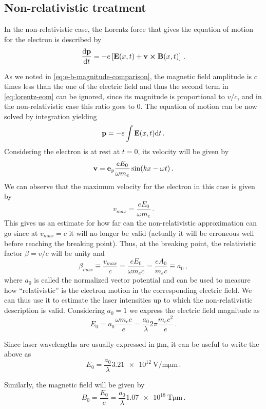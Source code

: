 \documentclass[12pt, class=report, crop=false]{standalone}
\begin{document}
\subsection{Non-relativistic treatment}

In the non-relativistic case, the Lorentz force that gives the equation of motion for the electron is described by
\begin{equation}
  \label{eq:lorentz-eom}
  \dv{\vb{p}}{t} = -e \left[ \vb{E}(x, t) + \vb{v} \cp \vb{B}(x, t) \right]\,.
\end{equation}

As we noted in \cref{eq:e-b-magnitude-comparison}, the magnetic field amplitude is \(c\) times less than the one
of the electric field and thus the second term in \cref{eq:lorentz-eom} can be ignored, since its magnitude
is proportional to \(v/c\), and in the non-relativistic case
this ratio goes to 0. The equation of motion can be now solved by integration yielding
\[
\vb{p} = -e \int \vb{E}(x,t) \dd t\,.
\]
Considering the electron is at rest at \(t=0\), its velocity
will be given by
\[
\vb{v} = \vb{e}_y \frac{e E_0}{\omega m_e} \sin(kx - \omega t)\,.
\]
We can observe that the maximum velocity for the electron in this case is given by
\[
v_{max} = \frac{e E_0}{\omega m_e}\,. %
\]
This gives us an estimate for how far can the non-relativistic approximation can go
since at \(v_{max}=c\) it will no longer be valid  %
(actually it will be erroneous well before reaching the breaking point).
Thus, at the breaking point, the relativistic factor \(\beta = v/c\) will be unity and
\[
\beta_{max} \equiv \frac{v_{max}}{c} = \frac{e E_0}{\omega m_e c} = \frac{e A_0}{m_e c} \equiv a_0\,,  %
\]
where \(a_0\) is called the normalized vector potential and
can be used to measure how ``relativistic'' is the electron motion in the corresponding electric field.
We can thus use it to estimate the laser intensities up to which the non-relativistic description is valid.
Considering \(a_0=1\) we express the electric field magnitude as
\[
E_0 = a_0 \frac{\omega m_e c}{e} = \frac{a_0}{\lambda} 2\pi \frac{m_e c^2}{e}\,.
\]

Since laser wavelengths are usually expressed in \si{\micro\metre}, it can be useful to write the above as
\[
E_0 = \frac{a_0}{\lambda} \SI{3.21e12}{\volt\per\metre\micro\metre}\,.
\]

Similarly, the magnetic field will be given by
\[
B_0 = \frac{E_0}{c} = \frac{a_0}{\lambda} \SI{1.07e18}{\tesla\micro\metre}\,.
\]
\end{document}
